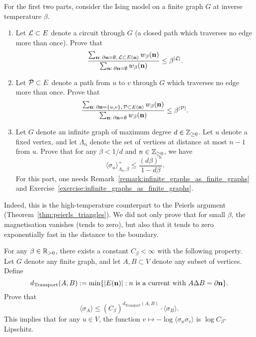 \begin{exercise}
    \label{exercise:currents_peierls}
    For the first two parts, consider
    the Ising model on a finite graph $G$ at inverse temperature $\beta$.
    \begin{enumerate}
        \item Let $\mathcal L\subset E$ denote a circuit through $G$
        (a closed path which traverses no edge more than once).
        Prove that
        \[
            \frac{
                \sum_{\mathbf{n}:\:\partial\mathbf{n}=\emptyset,\,\mathcal L\subset E(\mathbf{n})} w_\beta(\mathbf{n})
            }{
                \sum_{\mathbf{n}:\:\partial\mathbf{n}=\emptyset} w_\beta(\mathbf{n})
            }
            \leq
            \beta^{|\mathcal L|}.
        \]
        \item Let $\mathcal P\subset E$ denote a path from $u$ to $v$ through $G$
        which traverses no edge more than once.
        Prove that
        \[
            \frac{
                \sum_{\mathbf{n}:\:\partial\mathbf{n}=\{u,v\},\,\mathcal P\subset E(\mathbf{n})} w_\beta(\mathbf{n})
            }{
                \sum_{\mathbf{n}:\:\partial\mathbf{n}=\emptyset} w_\beta(\mathbf{n})
            }
            \leq
            \beta^{|\mathcal P|}.
        \]
        \item Let $G$ denote an infinite graph of maximum degree $d\in\mathbb Z_{\geq 0}$.
        Let $u$ denote a fixed vertex, and let $\Lambda_n$ denote the set of vertices
        at distance at most $n-1$ from $u$.
        Prove that for any $\beta<1/d$ and $n\in\mathbb Z_{\geq 0}$, we have
        \[
            \langle\sigma_u\rangle_{\Lambda_n,\beta}^+
            \leq
            \frac{(d\beta)^n}{1-d\beta}.
        \]
        For this part, one needs Remark~\ref{remark:infinite_graphs_as_finite_graphs}
        and Exercise~\ref{exercise:infinite_graphs_as_finite_graphs}.
    \end{enumerate}
    Indeed, this is the high-temperature counterpart to the Peierls argument
    (Theorem~\ref{thm:peierls_triangles}).
    We did not only prove that for small $\beta$, the magnetisation vanishes
    (tends to zero),
    but also that it tends to zero exponentially fast in the distance to the boundary.
\end{exercise}

\begin{exercise}[difficult]
    For any $\beta\in\mathbb R_{>0}$, there exists a constant $C_\beta< \infty$
    with the following property.
    Let $G$ denote any finite graph,
    and let $A,B\subset V$ denote any subset of vertices.
    Define
    \[
        d_{\operatorname{Transport}}(A,B)
        :=
        \min\{|E(\n)|:\text{$n$ is a current with $A\Delta B=\partial\n$}\}.
    \]
    Prove that
    \[
        \langle\sigma_A\rangle \leq (C_\beta)^{d_{\operatorname{Transport}}(A,B)}\cdot \langle\sigma_B\rangle. 
    \]
    This implies that for any $u\in V$,
    the function $v\mapsto-\log \langle\sigma_u\sigma_v\rangle$ is $\log C_\beta$-Lipschitz.
\end{exercise}


